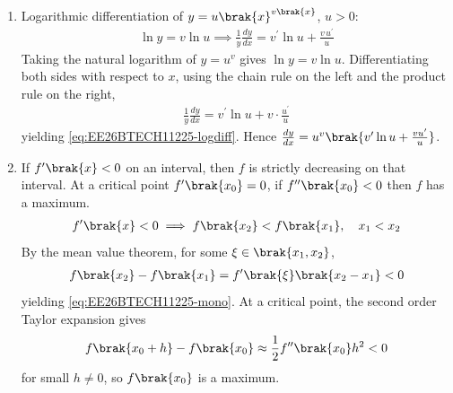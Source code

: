 \begin{enumerate}[label=\thesubsection.\arabic*, ref=\thesubsection.\theenumi]
\item Logarithmic differentiation of $y = u\brak{x}^{v\brak{x}}$, $u > 0$:
\begin{align}
	\ln y = v\ln u \implies \frac{1}{y}\frac{dy}{dx} = v^{\prime}\ln u + \frac{v\,u^{\prime}}{u}
	\label{eq:EE26BTECH11225-logdiff}
\end{align}
\solution
Taking the natural logarithm of $y = u^v$ gives $\ln y = v\ln u$. Differentiating both sides with respect to $x$, using the chain rule on the left and the product rule on the right,
\begin{align}
	\frac{1}{y}\frac{dy}{dx} = v^{\prime}\ln u + v\cdot\frac{u^{\prime}}{u}
\end{align}
yielding \eqref{eq:EE26BTECH11225-logdiff}. Hence $\frac{dy}{dx} = u^v\brak{v^{\prime}\ln u + \frac{v u^{\prime}}{u}}$.

\item If $f^{\prime}\brak{x} < 0$ on an interval, then $f$ is strictly decreasing on that interval. At a critical point $f^{\prime}\brak{x_0} = 0$, if $f^{\prime\prime}\brak{x_0} < 0$ then $f$ has a maximum.
\begin{align}
	f^{\prime}\brak{x} < 0 \implies f\brak{x_2} < f\brak{x_1}, \quad x_1 < x_2
	\label{eq:EE26BTECH11225-mono}
\end{align}
\solution
By the mean value theorem, for some $\xi \in \brak{x_1, x_2}$,
\begin{align}
	f\brak{x_2} - f\brak{x_1} = f^{\prime}\brak{\xi}\brak{x_2 - x_1} < 0
\end{align}
yielding \eqref{eq:EE26BTECH11225-mono}. At a critical point, the second order Taylor expansion gives
\begin{align}
	f\brak{x_0 + h} - f\brak{x_0} \approx \frac{1}{2}f^{\prime\prime}\brak{x_0}h^2 < 0
\end{align}
for small $h \neq 0$, so $f\brak{x_0}$ is a maximum.


\end{enumerate}
